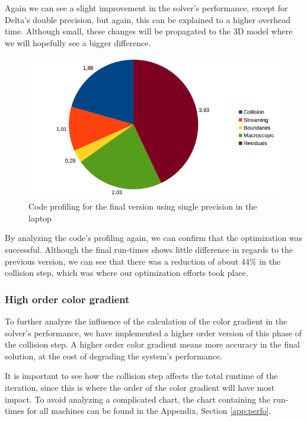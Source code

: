 \documentclass[12pt]{book}
\begin{document}
  Again we can see a slight improvement in the solver's performance, except for Delta's double precision, but again, this can be explained to a higher overhead time. Although small, these changes will be propagated to the 3D model where we will hopefully see a bigger difference.
  
  \begin{figure}[H]
  	\centering
  	\includegraphics[width=\linewidth]{Resources/Images/vfvprofile.png}
  	\caption{Code profiling for the final version using single precision in the laptop}
  	\label{fig:vfvprofile}
  \end{figure}
  
  By analyzing the code's profiling again, we can confirm that the optimization was successful. Although the final run-times shows little difference in regards to the previous version, we can see that there was a reduction of about 44\% in the collision step, which was where our optimization efforts took place.
  
\subsubsection{High order color gradient}
To further analyze the influence of the calculation of the color gradient in the solver's performance, we have implemented a higher order version of this phase of the collision step. A higher order color gradient means more accuracy in the final solution, at the cost of degrading the system's performance.\par
It is important to see how the collision step affects the total runtime of the iteration, since this is where the order of the color gradient will have most impact. To avoid analyzing a complicated chart, the chart containing the run-times for all machines can be found in the Appendix, Section \ref{app:perfo}.
\end{document}
